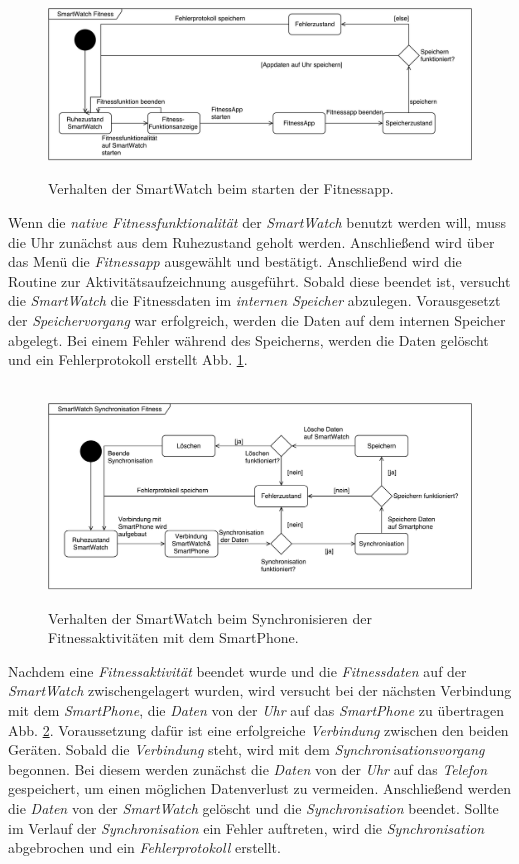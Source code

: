 \begin{figure}[h]
\centering\
\includegraphics[width=\textwidth]{img/stateFitness}
\caption[State Diagram: Fitness]{Verhalten der SmartWatch beim starten der Fitnessapp.}
\label{fig:stateFitness}
\end{figure}
Wenn die \textit{native Fitnessfunktionalität} der \textit{SmartWatch} benutzt werden will, muss die Uhr zunächst aus dem Ruhezustand geholt werden. Anschließend wird über das Menü die \textit{Fitnessapp} ausgewählt und bestätigt. Anschließend wird die Routine zur Aktivitätsaufzeichnung ausgeführt. Sobald diese beendet ist, versucht die \textit{SmartWatch} die Fitnessdaten im \textit{internen Speicher} abzulegen. Vorausgesetzt der \textit{Speichervorgang} war erfolgreich, werden die Daten auf dem internen Speicher abgelegt. Bei einem Fehler während des Speicherns, werden die Daten gelöscht und ein Fehlerprotokoll erstellt Abb. \ref{fig:stateFitness}.\\
\begin{figure}[h]
\centering\
\includegraphics[width=\textwidth]{img/stateSync}
\caption[State Diagram: Synchronisation]{Verhalten der SmartWatch beim Synchronisieren der Fitnessaktivitäten mit dem SmartPhone.}
\label{fig:stateSync}
\end{figure}
Nachdem eine \textit{Fitnessaktivität} beendet wurde und die \textit{Fitnessdaten} auf der \textit{SmartWatch} zwischengelagert wurden, wird versucht bei der nächsten Verbindung mit dem \textit{SmartPhone}, die \textit{Daten} von der \textit{Uhr} auf das \textit{SmartPhone} zu übertragen Abb. \ref{fig:stateSync}. Voraussetzung dafür ist eine erfolgreiche \textit{Verbindung} zwischen den beiden Geräten. Sobald die \textit{Verbindung} steht, wird mit dem \textit{Synchronisationsvorgang} begonnen. Bei diesem werden zunächst die \textit{Daten} von der \textit{Uhr} auf das \textit{Telefon} gespeichert, um einen möglichen Datenverlust zu vermeiden. Anschließend werden die \textit{Daten} von der \textit{SmartWatch} gelöscht und die \textit{Synchronisation} beendet. Sollte im Verlauf der \textit{Synchronisation} ein Fehler auftreten, wird die \textit{Synchronisation} abgebrochen und ein \textit{Fehlerprotokoll} erstellt. \\
